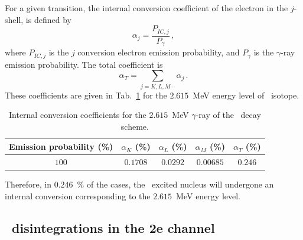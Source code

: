 For a given transition, the internal conversion coefficient of the electron in the $j$-shell, is defined by
\begin{equation}
\alpha_{j}=\frac{P_{IC, j}}{P_{\gamma}}\,,
\end{equation}
where $P_{IC,j}$ is the $j$ conversion electron emission probability, and $P_{\gamma}$ is the $\gamma$-ray emission probability.
The total coefficient is
\begin{equation}
  \alpha_{T}=\sum_{j=K,L,M\cdots}\alpha_{j}\,.
\end{equation}
These coefficients are given in Tab.~\ref{tab:IC_prob} for the $2.615$~MeV energy level of \Tl\ isotope.
\begin{table}[!h]
  \centering
  \begin{tabular}{|c|c|c|c|c|}
    \hline
    Emission probability (\%) & $\alpha_{K}$ (\%) & $\alpha_{L}$ (\%) & $\alpha_{M}$ (\%) & $\alpha_{T}$ (\%) \\
    \hline\hline
    $100$ & $0.1708$ &    $0.0292$ &  $0.00685$  &    $0.246$ \\
    \hline
  \end{tabular}
  \caption{Internal conversion coefficients for the $2.615$~MeV $\gamma$-ray of the \Tl\ decay scheme.
    \label{tab:IC_prob}}
\end{table}
Therefore, in $0.246$~\% of the cases, the \Pb\ excited nucleus will undergone an internal conversion corresponding to the $2.615$~MeV energy level.


\subsection{\Tl\ disintegrations in the 2e channel}

